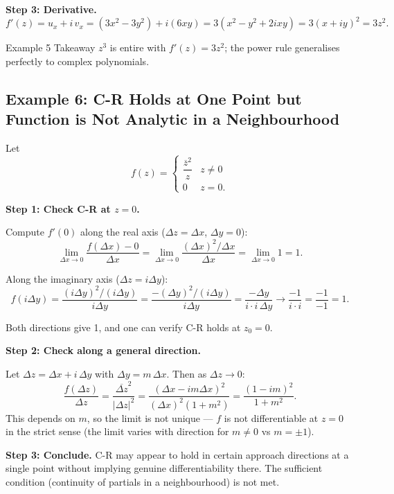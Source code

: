 \documentclass[12pt,a4paper]{article}
\begin{document}
\textbf{Step 3: Derivative.}
\[
  f'(z) = u_x + i\,v_x = (3x^2-3y^2) + i(6xy) = 3(x^2-y^2+2ixy) = 3(x+iy)^2 = 3z^2.
\]

\begin{learnbox}{Example 5 Takeaway}
$z^3$ is entire with $f'(z)=3z^2$; the power rule generalises perfectly to complex polynomials.
\end{learnbox}

\subsection*{Example 6: C-R Holds at One Point but Function is Not Analytic in a Neighbourhood}

Let
\[
  f(z) = \begin{cases} \dfrac{\overline{z}^2}{z} & z \neq 0 \\ 0 & z = 0. \end{cases}
\]

\textbf{Step 1: Check C-R at $z = 0$.}

Compute $f'(0)$ along the real axis ($\Delta z = \Delta x$, $\Delta y = 0$):
\[
  \lim_{\Delta x \to 0} \frac{f(\Delta x) - 0}{\Delta x}
  = \lim_{\Delta x \to 0} \frac{(\Delta x)^2/\Delta x}{\Delta x}
  = \lim_{\Delta x \to 0} 1 = 1.
\]

Along the imaginary axis ($\Delta z = i\Delta y$):
\[
  f(i\Delta y) = \frac{(i\Delta y)^2/(i\Delta y)}{i\Delta y}
  = \frac{-(\Delta y)^2/(i\Delta y)}{i\Delta y}
  = \frac{-\Delta y}{i \cdot i\,\Delta y}
  \to \frac{-1}{i \cdot i} = \frac{-1}{-1} = 1.
\]

Both directions give 1, and one can verify C-R holds at $z_0 = 0$.

\textbf{Step 2: Check along a general direction.}

Let $\Delta z = \Delta x + i\,\Delta y$ with $\Delta y = m\,\Delta x$. Then as $\Delta z \to 0$:
\[
  \frac{f(\Delta z)}{\Delta z} = \frac{\overline{\Delta z}^2}{|\Delta z|^2}
  = \frac{(\Delta x - im\Delta x)^2}{(\Delta x)^2(1+m^2)}
  = \frac{(1-im)^2}{1+m^2}.
\]
This depends on $m$, so the limit is not unique --- $f$ is not differentiable at $z = 0$ in the strict sense (the limit varies with direction for $m \neq 0$ vs $m = \pm 1$).

\textbf{Step 3: Conclude.}
C-R may appear to hold in certain approach directions at a single point without implying genuine differentiability there. The sufficient condition (continuity of partials in a neighbourhood) is not met.
\end{document}
